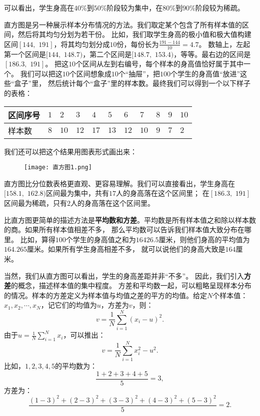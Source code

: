 \documentclass[12pt,UTF8]{ctexbook}
\begin{document}
可以看出，学生身高在$40\%$到$50\%$阶段较为集中，在$80\%$到$90\%$阶段较为稀疏。


直方图是另一种展示样本分布情况的方法。我们取定某个包含了所有样本值的区间，然后将其均匀分划为若干份。
比如，我们取学生身高的极小值和极大值构建区间$[144, \,\,191]$，将其均匀划分成$10$份，每份长为$\frac{191-144}{10}=4.7$。
数轴上，左起第一个区间是$[144, \,\,148.7)$，第二个区间是$[148.7, \,\,153.4)$，等等。最右边的区间是$[186.3, \,\, 191]$。
把这$10$个区间从左到右编号，每个样本的身高值恰好属于其中一个。
我们可以把这$10$个区间想象成$10$个“抽屉”，把$100$个学生的身高值“放进”这些“盒子”里，
然后统计每个“盒子”里的样本数。最终我们可以得到一个以下样子的表格：
\begin{center}
    \begin{tabular}{ | p{4em}<{\centering} | p{1.7em}<{\centering} | p{1.7em}<{\centering} | p{1.7em}<{\centering} | p{1.7em}<{\centering} | p{1.7em}<{\centering} | p{1.7em}<{\centering} | p{1.7em}<{\centering} | p{1.7em}<{\centering} | p{1.7em}<{\centering} | p{1.7em}<{\centering} | }
        \hline
        区间序号 & $1$ & $2$  & $3$  & $4$  & $5$  & $6$  & $7$  & $8$ & $9$ & $10$ \\ [0.5ex] 
        \hline
        样本数   & $8$ & $10$ & $12$ & $17$ & $13$ & $12$ & $10$ & $9$ & $7$ & $2$  \\  
        \hline
    \end{tabular}
\end{center}
我们还可以把这个结果用图表形式画出来：

\begin{figure}[h] %
    \vspace{8pt}
    \centering
    \texttt{[image: 直方图1.png]}
\end{figure}

直方图比分位数表格更直观、更容易理解。我们可以直接看出，学生身高在$[158.1, \,\, 162.8)$区间最为集中，共有$17$人的身高落在这个区间里；
在$[186.3, \,\, 191]$区间最为稀疏，只有$2$人的身高落在这个区间里。

比直方图更简单的描述方法是\textbf{平均数和方差}。平均数是所有样本值之和除以样本数的商。如果所有样本值相差不多，
那么平均数可以告诉我们样本值大致分布在哪里。
比如，算得$100$个学生的身高值之和为$16426.5$厘米，则他们身高的平均值为$164.265$厘米。如果所有学生身高相差不多，
就可以说他们的身高大致是$164$厘米。

当然，我们从直方图可以看出，学生的身高差距并非“不多”。
因此，我们引入\textbf{方差}的概念，描述样本值的集中程度。
方差和平均数一起，可以粗略呈现样本分布的情况。样本的方差定义为样本值与均值之差的平方的均值。给定$N$个样本值：
$x_1, x_2, \cdots, x_N$，记它们的均值为$u$，方差为$v$，则：
$$ v = \frac{1}{N}\sum_{i=1}^N \left(x_i - u\right)^2.$$
由于$u = \frac{1}{N}\sum_{i=1}^N x_i$，可以推出：
$$v = \frac{1}{N}\sum_{i=1}^N x_i^2 - u^2.$$
比如，$1,2,3,4,5$的平均数为：
$$ \frac{1+2+3+4+5}{5} = 3,$$
方差为：
$$ \frac{(1 - 3)^2 + (2 - 3)^2 + (3 - 3)^2 + (4 - 3)^2 + (5 - 3)^2}{5} = 2.$$
\end{document}
